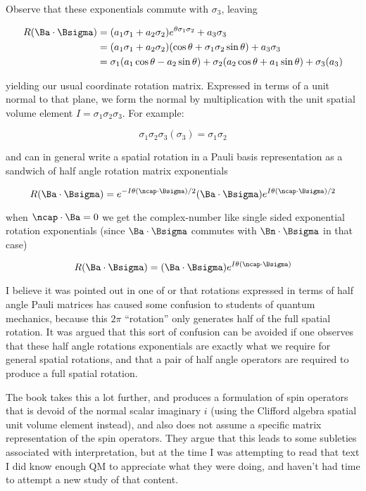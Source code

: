 Observe that these exponentials commute with $\sigma_3$, leaving

\begin{align*}
R( \Ba \cdot \Bsigma) 
&= 
(a_1 \sigma_1 + a_2 \sigma_2) e^{\theta \sigma_1 \sigma_2} +  
a_3 \sigma_3 \\
&= 
(a_1 \sigma_1 + a_2 \sigma_2) (\cos\theta + \sigma_1 \sigma_2 \sin\theta)
+a_3 \sigma_3 \\
&= 
\sigma_1 (a_1 \cos\theta - a_2 \sin\theta)
+ \sigma_2 (a_2 \cos\theta + a_1 \sin\theta)
+ \sigma_3 (a_3)
\end{align*}

yielding our usual coordinate rotation matrix.  Expressed in terms of a unit normal to that plane, we form the normal by multiplication with the unit spatial volume element $I = \sigma_1 \sigma_2 \sigma_3$.  For example:

\begin{equation}\label{eqn:qmTwoL15:n}
\sigma_1 \sigma_2 \sigma_3( \sigma_3 )
=
\sigma_1 \sigma_2 
\end{equation}

and can in general write a spatial rotation in a Pauli basis representation as a sandwich of half angle rotation matrix exponentials 

\begin{equation}\label{eqn:qmTwoL15:n}
R( \Ba \cdot \Bsigma) 
= 
e^{-I \theta (\ncap \cdot \Bsigma)/2} 
(\Ba \cdot \Bsigma)
e^{I \theta (\ncap \cdot \Bsigma)/2} 
\end{equation}

when $\ncap \cdot \Ba = 0$ we get the complex-number like single sided exponential rotation exponentials (since $\Ba \cdot \Bsigma$ commutes with $\Bn \cdot \Bsigma$ in that case)

\begin{equation}\label{eqn:qmTwoL15:n}
R( \Ba \cdot \Bsigma) 
= 
(\Ba \cdot \Bsigma )
e^{I \theta (\ncap \cdot \Bsigma)} 
\end{equation}

I believe it was pointed out in one of \cite{doran2003gap} or \cite{hestenes1999nfc} that rotations expressed in terms of half angle Pauli matrices has caused some confusion to students of quantum mechanics, because this $2 \pi$ ``rotation'' only generates half of the full spatial rotation.  It was argued that this sort of confusion can be avoided if one observes that these half angle rotations exponentials are exactly what we require for general spatial rotations, and that a pair of half angle operators are required to produce a full spatial rotation.  

The book \cite{doran2003gap} takes this a lot further, and produces a formulation of spin operators that is devoid of the normal scalar imaginary $i$ (using the Clifford algebra spatial unit volume element instead), and also does not assume a specific matrix representation of the spin operators.  They argue that this leads to some subleties associated with interpretation, but at the time I was attempting to read that text I did know enough QM to appreciate what they were doing, and haven't had time to attempt a new study of that content.

\EndArticle

